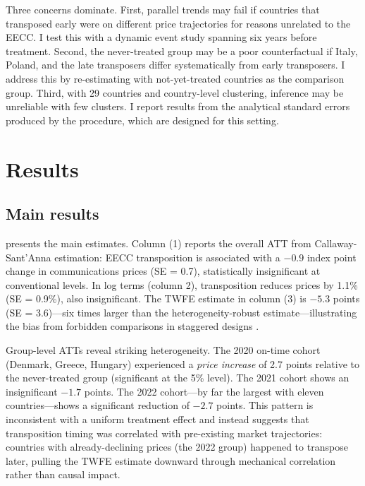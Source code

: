 \documentclass[12pt]{article}
\begin{document}
Three concerns dominate. First, parallel trends may fail if countries that transposed early were on different price trajectories for reasons unrelated to the EECC. I test this with a dynamic event study spanning six years before treatment. Second, the never-treated group may be a poor counterfactual if Italy, Poland, and the late transposers differ systematically from early transposers. I address this by re-estimating with not-yet-treated countries as the comparison group. Third, with 29 countries and country-level clustering, inference may be unreliable with few clusters. I report results from the analytical standard errors produced by the \citet{callaway2021} procedure, which are designed for this setting.

\section{Results}

\subsection{Main results}

 presents the main estimates. Column (1) reports the overall ATT from Callaway-Sant'Anna estimation: EECC transposition is associated with a $-0.9$ index point change in communications prices (SE = 0.7), statistically insignificant at conventional levels. In log terms (column 2), transposition reduces prices by 1.1\% (SE = 0.9\%), also insignificant. The TWFE estimate in column (3) is $-5.3$ points (SE = 3.6)---six times larger than the heterogeneity-robust estimate---illustrating the bias from forbidden comparisons in staggered designs \citep{goodmanbacon2021}.

Group-level ATTs reveal striking heterogeneity. The 2020 on-time cohort (Denmark, Greece, Hungary) experienced a \textit{price increase} of 2.7 points relative to the never-treated group (significant at the 5\% level). The 2021 cohort shows an insignificant $-1.7$ points. The 2022 cohort---by far the largest with eleven countries---shows a significant reduction of $-2.7$ points. This pattern is inconsistent with a uniform treatment effect and instead suggests that transposition timing was correlated with pre-existing market trajectories: countries with already-declining prices (the 2022 group) happened to transpose later, pulling the TWFE estimate downward through mechanical correlation rather than causal impact.


\end{document}
